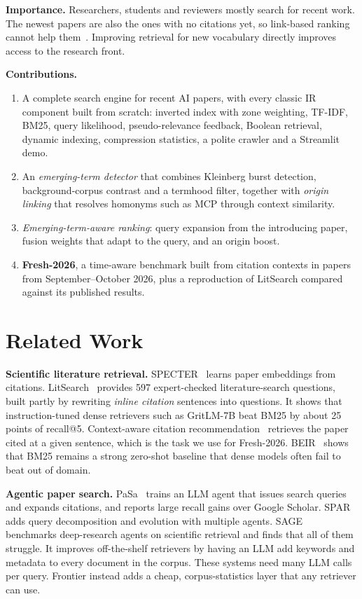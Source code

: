 \documentclass[10pt,twocolumn]{article}
\begin{document}
\textbf{Importance.} Researchers, students and reviewers mostly search for recent
work. The newest papers are also the ones with no citations yet, so link-based
ranking cannot help them~\cite{page1999}. Improving retrieval for new
vocabulary directly improves access to the research front.

\textbf{Contributions.}
\begin{enumerate}\itemsep0pt
\item A complete search engine for recent AI papers, with every classic IR component
built from scratch: inverted index with zone weighting, TF-IDF, BM25, query
likelihood, pseudo-relevance feedback, Boolean retrieval, dynamic indexing,
compression statistics, a polite crawler and a Streamlit demo.
\item An \emph{emerging-term detector} that combines Kleinberg burst detection,
background-corpus contrast and a termhood filter, together with \emph{origin linking}
that resolves homonyms such as MCP through context similarity.
\item \emph{Emerging-term-aware ranking}: query expansion from the introducing paper,
fusion weights that adapt to the query, and an origin boost.
\item \textbf{Fresh-2026}, a time-aware benchmark built from citation contexts in
\NPapers{} papers from September--October 2026, plus a reproduction of LitSearch
compared against its published results.
\end{enumerate}

\section{Related Work}
\textbf{Scientific literature retrieval.} SPECTER~\cite{cohan2020} learns paper
embeddings from citations. LitSearch~\cite{ajith2024} provides 597 expert-checked
literature-search questions, built partly by rewriting \emph{inline citation}
sentences into questions. It shows that instruction-tuned dense retrievers such as
GritLM-7B beat BM25 by about 25 points of recall@5. Context-aware citation
recommendation~\cite{he2010} retrieves the paper cited at a given sentence, which is
the task we use for Fresh-2026. BEIR~\cite{thakur2021} shows that BM25 remains a
strong zero-shot baseline that dense models often fail to beat out of domain.

\textbf{Agentic paper search.} PaSa~\cite{he2025} trains an LLM agent that issues
search queries and expands citations, and reports large recall gains over Google
Scholar. SPAR~\cite{shi2025} adds query decomposition and evolution with multiple
agents. SAGE~\cite{hu2026} benchmarks deep-research agents on scientific retrieval
and finds that all of them struggle. It improves off-the-shelf retrievers by having
an LLM add keywords and metadata to every document in the corpus. These systems need
many LLM calls per query. Frontier instead adds a cheap, corpus-statistics layer that
any retriever can use.
\end{document}

